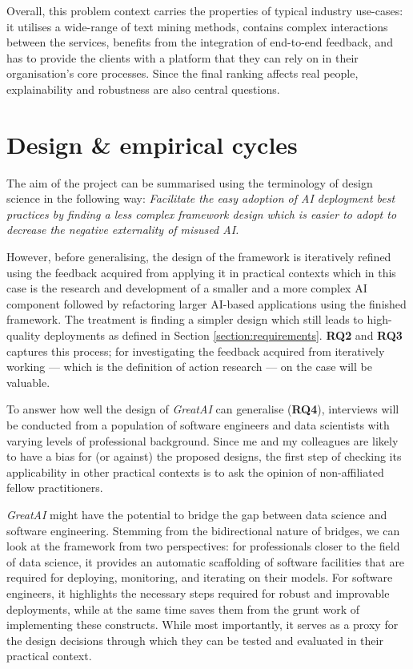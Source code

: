 Overall, this problem context carries the properties of typical industry use-cases: it utilises a wide-range of text mining methods, contains complex interactions between the services, benefits from the integration of end-to-end feedback, and has to provide the clients with a platform that they can rely on in their organisation's core processes. Since the final ranking affects real people, explainability and robustness are also central questions.

\section{Design \& empirical cycles}

The aim of the project can be summarised using the terminology of design science in the following way: 
\textit{Facilitate the easy adoption of AI deployment best practices
by finding a less complex framework design 
which is easier to adopt
to decrease the negative externality of misused AI.}

However, before generalising, the design of the framework is iteratively refined using the feedback acquired from applying it in practical contexts which in this case is the research and development of a smaller and a more complex AI component followed by refactoring larger AI-based applications using the finished framework. The treatment is finding a simpler design which still leads to high-quality deployments as defined in Section \ref{section:requirements}. \textbf{RQ2} and \textbf{RQ3} captures this process; for investigating the feedback acquired from iteratively working --- which is the definition of action research --- on the case will be valuable. 

To answer how well the design of \textit{GreatAI} can generalise (\textbf{RQ4}), interviews will be conducted from a population of software engineers and data scientists with varying levels of professional background. Since me and my colleagues are likely to have a bias for (or against) the proposed designs, the first step of checking its applicability in other practical contexts is to ask the opinion of non-affiliated fellow practitioners.

\textit{GreatAI} might have the potential to bridge the gap between data science and software engineering. Stemming from the bidirectional nature of bridges, we can look at the framework from two perspectives: for professionals closer to the field of data science, it provides an automatic scaffolding of software facilities that are required for deploying, monitoring, and iterating on their models. For software engineers, it highlights the necessary steps required for robust and improvable deployments, while at the same time saves them from the grunt work of implementing these constructs. While most importantly, it serves as a proxy for the design decisions through which they can be tested and evaluated in their practical context.
